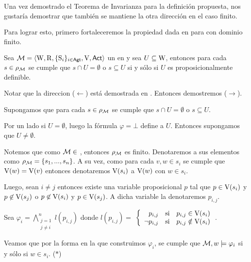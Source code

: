 Una vez demostrado el Teorema de Invarianza para la definición propuesta, nos gustaría demostrar que también se mantiene la otra dirección en
el caso finito. 

Para lograr esto, primero fortaleceremos la propiedad dada en  para \ultss con dominio finito. 

\begin{lema}\label{lema:finite-propositionally-definable-lemma}
    Sea $\mathcal{M}=\langle \mathrm{W},\mathrm{R},\{ \mathrm{S}_i \}_{i \in {\rm \sf Agt}},\mathrm{V},{\rm \sf Act} \rangle$ un \ults en \MFD y sea $U \subseteq \mathrm{W}$, entonces
    para cada $s \in \rho_{\mathcal{M}}$ se cumple que $s \cap U = \emptyset$ o $s \subseteq U$ si y sólo si $U$ es proposicionalmente definible.
\end{lema}

\begin{demostracion}
    Notar que la direccion ($\leftarrow$) está demostrada en . Entonces demostremos ($\rightarrow$).

    Supongamos que para cada $s \in \rho_{\mathcal{M}}$ se cumple que $s \cap U = \emptyset$ o $s \subseteq U$.

    Por un lado si $U = \emptyset$, luego la fórmula $ \varphi = \bot$ define a $U$. Entonces supongamos que $U \neq \emptyset$. 
    
    Notemos que como $\mathcal{M} \in$ \MFD, entonces $\rho_{\mathcal{M}}$ es finito. Denotaremos a sus elementos como $\rho_{\mathcal{M}} = \{s_1,...,s_n\}$. 
    A su vez, como para cada $v,w \in s_i$ se cumple que $\mathrm{V}(w) = \mathrm{V}(v)$ entonces denotaremos $\mathrm{V}(s_i)$ a $\mathrm{V}(w)$ con $w \in s_i$. 
    
    Luego, sean $i \neq j$ entonces existe una variable proposicional $p$ tal que $p \in \mathrm{V}(s_i)$ y $p \not\in \mathrm{V}(s_j)$ o $p \not\in \mathrm{V}(s_i)$ 
    y $p \in \mathrm{V}(s_j)$. A dicha variable la denotaremos $p_{i,j}$.



    Sea $\varphi_i = \bigwedge\limits_{\substack{j = 1 \\ j \neq i}}^{n} l(p_{i,j})$ donde $l(p_{i,j}) = $
    $\left\{ \begin{array}{rcl}
            p_{i,j} & \mbox{si}
            & p_{i,j} \in \mathrm{V}(s_i) \\ \neg p_{i,j} & \mbox{si} & p_{i,j} \notin \mathrm{V}(s_i) \\
            \end{array}\right. 
    $.

    Veamos que por la forma en la que construimos $\varphi_i$, se cumple que $\mathcal{M}, w \models \varphi_i$ si y sólo si $w \in s_i$. ($*$)
    

\end{demostracion}
